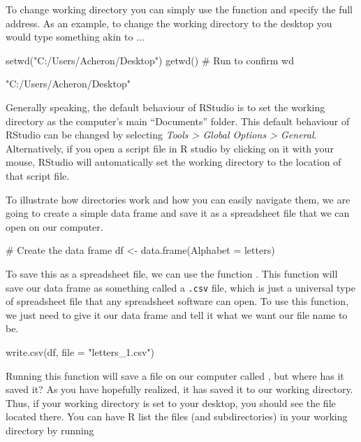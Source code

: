 To change working directory you can simply use the function  and specify the full address. As an example, to change the working directory to the desktop you would type something akin to ...

\begin{inR}
setwd("C:/Users/Acheron/Desktop")
getwd() # Run to confirm wd
\end{inR}

\begin{outR}
[1] "C:/Users/Acheron/Desktop"
\end{outR}

Generally speaking, the default behaviour of RStudio is to set the working directory as the computer's main ``Documents'' folder. This default behaviour of RStudio can be changed by selecting \textit{Tools > Global Options > General}. Alternatively, if you open a script file in R studio by clicking on it with your mouse, RStudio will automatically set the working directory to the location of that script file.

To illustrate how directories work and how you can easily navigate them, we are going to create a simple data frame and save it as a spreadsheet file that we can open on our computer.

\begin{inR}
# Create the data frame
df <- data.frame(Alphabet = letters)
\end{inR}

\noindent
To save this as a spreadsheet file, we can use the function . This function will save our data frame as something called a \texttt{.csv} file, which is just a universal type of spreadsheet file that any spreadsheet software can open. To use this function, we just need to give it our data frame and tell it what we want our file name to be.

\begin{inR}
write.csv(df, file = "letters_1.csv")
\end{inR}

\vspace{1em}

Running this function will save a file on our computer called , but where has it saved it? As you have hopefully realized, it has saved it to our working directory. Thus, if your working directory is set to your desktop, you should see the file  located there. You can have R list the files (and subdirectories) in your working directory by running

